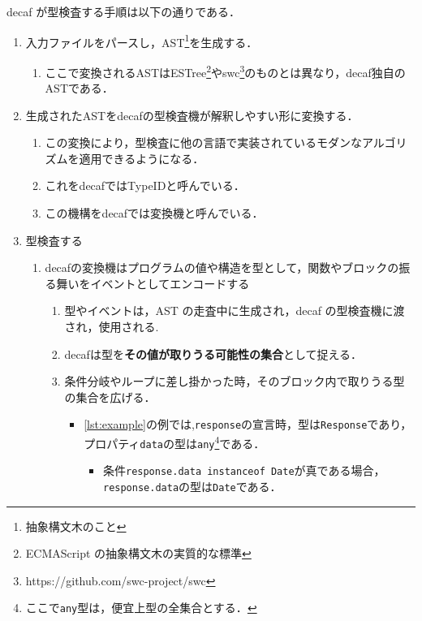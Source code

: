 decaf が型検査する手順は以下の通りである．

\begin{enumerate}
    \item 入力ファイルをパースし，AST\footnote{抽象構文木のこと}を生成する．
          \begin{enumerate}
              \item ここで変換されるASTはESTree\footnote{ECMAScript の抽象構文木の実質的な標準}やswc\footnote{https://github.com/swc-project/swc}のものとは異なり，decaf独自のASTである．
          \end{enumerate}
    \item 生成されたASTをdecafの型検査機が解釈しやすい形に変換する．
          \begin{enumerate}
              \item この変換により，型検査に他の言語で実装されているモダンなアルゴリズムを適用できるようになる．
              \item これをdecafではTypeIDと呼んでいる．
              \item この機構をdecafでは変換機と呼んでいる．
          \end{enumerate}
    \item 型検査する
          \begin{enumerate}
              \item decafの変換機はプログラムの値や構造を型として，関数やブロックの振る舞いをイベントとしてエンコードする
                    \begin{enumerate}
                        \item 型やイベントは，AST の走査中に生成され，decaf の型検査機に渡され，使用される.
                        \item decafは型を\textbf{その値が取りうる可能性の集合}として捉える．
                        \item 条件分岐やループに差し掛かった時，そのブロック内で取りうる型の集合を広げる．
                              \begin{itemize}
                                  \item \ref{lst:example}の例では,\texttt{response}の宣言時，型は\texttt{Response}であり，プロパティ\texttt{data}の型は\texttt{any}\footnote{ここで\texttt{any}型は，便宜上型の全集合とする．}である．
                                        \begin{itemize}
                                            \item 条件\texttt{response.data instanceof Date}が真である場合，\texttt{response.data}の型は\texttt{Date}である．

\end{itemize}
\end{itemize}
\end{enumerate}
\end{enumerate}
\end{enumerate}
